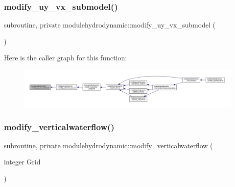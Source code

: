 \subsubsection{\texorpdfstring{modify\+\_\+uy\+\_\+vx\+\_\+submodel()}{modify\_uy\_vx\_submodel()}}
{\footnotesize\ttfamily subroutine, private modulehydrodynamic\+::modify\+\_\+uy\+\_\+vx\+\_\+submodel (\begin{DoxyParamCaption}{ }\end{DoxyParamCaption})\hspace{0.3cm}{\ttfamily [private]}}

Here is the caller graph for this function\+:\nopagebreak
\begin{figure}[H]
\begin{center}
\leavevmode
\includegraphics[width=350pt]{namespacemodulehydrodynamic_afcaf5434809b23ffd61b09505bfda4f4_icgraph}
\end{center}
\end{figure}
\mbox{\label{namespacemodulehydrodynamic_a46041cae58ee2c4998a230bec6a29842}} 
\subsubsection{\texorpdfstring{modify\+\_\+verticalwaterflow()}{modify\_verticalwaterflow()}}
{\footnotesize\ttfamily subroutine, private modulehydrodynamic\+::modify\+\_\+verticalwaterflow (\begin{DoxyParamCaption}\item[{integer}]{Grid }\end{DoxyParamCaption})\hspace{0.3cm}{\ttfamily [private]}}

